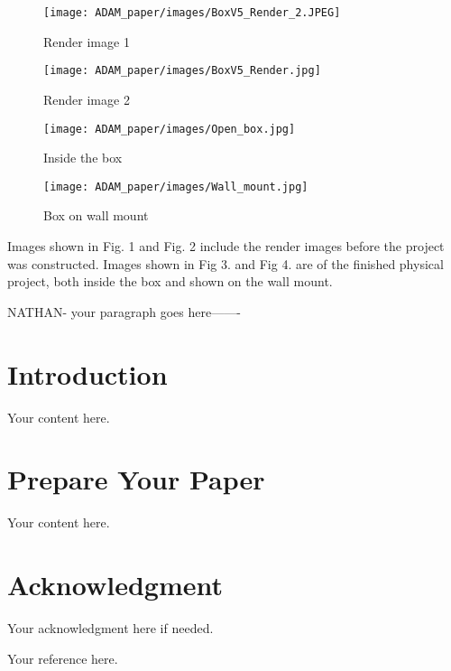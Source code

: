 \documentclass[conference]{IEEEtran}
\begin{document}
\begin{figure}
\label{fig-renders}
  \centering
  \begin{minipage}[b]{0.2\textwidth}
    \texttt{[image: ADAM\_paper/images/BoxV5\_Render\_2.JPEG]}
    \caption{Render image 1}
  \end{minipage}
  \hfill
  \begin{minipage}[b]{0.25\textwidth}
    \texttt{[image: ADAM\_paper/images/BoxV5\_Render.jpg]}
    \caption{Render image 2}
  \end{minipage}
\end{figure}

\begin{figure}[H]
\label{fig-images}
  \centering
  \begin{minipage}[b]{0.2\textwidth}
    \texttt{[image: ADAM\_paper/images/Open\_box.jpg]}
    \caption{Inside the box}
  \end{minipage}
  \hfill
  \begin{minipage}[b]{0.2\textwidth}
    \texttt{[image: ADAM\_paper/images/Wall\_mount.jpg]}
    \caption{Box on wall mount}
  \end{minipage}
\end{figure}

Images shown in Fig. 1 and Fig. 2 include the render images before the project was constructed. Images shown in Fig 3. and Fig 4. are of the finished physical project, both inside the box and shown on the wall mount.

NATHAN- your paragraph goes here-------

\section{Introduction}
Your content here.

\section{Prepare Your Paper}
Your content here.

\section*{Acknowledgment}
Your acknowledgment here if needed.


\begin{thebibliography}{00}
 Your reference here.
\end{thebibliography}
\end{document}
